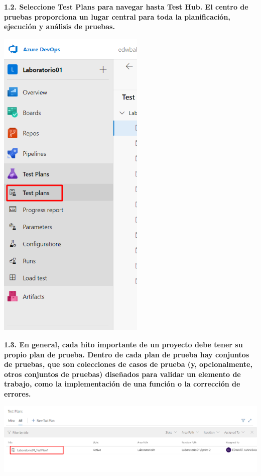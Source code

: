 \documentclass{article}
\begin{document}
\newpage
\textbf{1.2.  Seleccione Test Plans para navegar hasta Test Hub. El centro de pruebas proporciona un lugar central para toda la planificación, ejecución y análisis de pruebas.}

    \begin{center}
		\includegraphics[width=7cm]{./images/1.2} 
	\end{center}
	\newpage
\textbf{1.3. 
En general, cada hito importante de un proyecto debe tener su propio plan de prueba. Dentro de cada plan de prueba hay conjuntos de pruebas, que son colecciones de casos de prueba (y, opcionalmente, otros conjuntos de pruebas) diseñados para validar un elemento de trabajo, como la implementación de una función o la corrección de errores.}

    \begin{center}
		\includegraphics[width=14cm]{./images/1.3} 
	\end{center}
	
\end{document}

